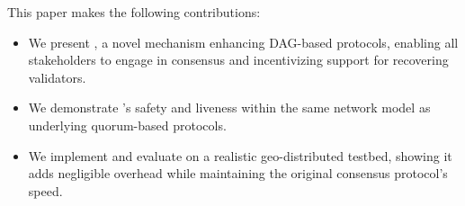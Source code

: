 
This paper makes the following contributions:
\begin{itemize}
      \item We present \sysname, a novel mechanism enhancing DAG-based protocols, enabling all stakeholders to engage in consensus and incentivizing support for recovering validators.
      \item We demonstrate \sysname's safety and liveness within the same network model as underlying quorum-based protocols.
      \item We implement and evaluate \sysname on a realistic geo-distributed testbed, showing it adds negligible overhead while maintaining the original consensus protocol's speed.
\end{itemize}
